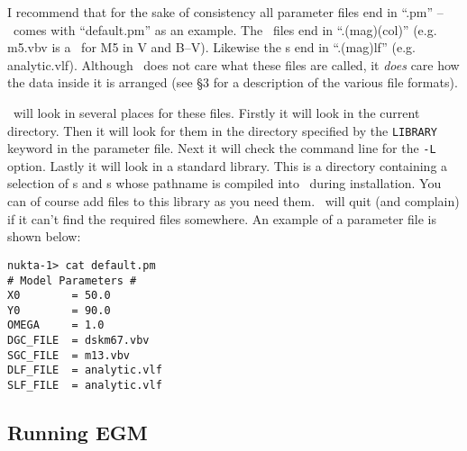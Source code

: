 I recommend that for the sake of consistency all parameter files end
in ``.pm'' -- \egm\ comes with ``default.pm'' as an example. The \cmd\ files
end in ``.(mag)(col)'' (e.g. m5.vbv is a \cmd\ for M5 in V and B--V). Likewise
the \lf s end in ``.(mag)lf'' (e.g. analytic.vlf).
Although \egm\ does not care what these files are called, it 
{\em does} care how the data inside it is arranged (see \S3 for a description
of the various file formats).

\egm\ will look in several places for these files. Firstly it
will look in the current directory. Then it will look for them in the
directory specified by the {\tt LIBRARY} keyword in the parameter file.
Next it will check the command line for the {\tt -L} option.
Lastly it will look in a standard 
library. This is a directory containing a selection of \lf s and \cmd s whose 
pathname is compiled into \egm\ during installation.
You can of course add files to this library as you need them.
\egm\ will quit (and complain) if it can't find the required files somewhere.
An example of a parameter file is shown below:
\begin{verbatim}
nukta-1> cat default.pm
# Model Parameters #
X0        = 50.0
Y0        = 90.0
OMEGA     = 1.0
DGC_FILE  = dskm67.vbv
SGC_FILE  = m13.vbv
DLF_FILE  = analytic.vlf
SLF_FILE  = analytic.vlf
\end{verbatim}

\subsection{Running EGM}

